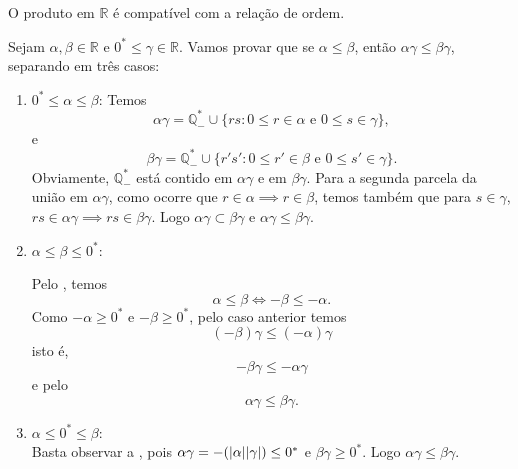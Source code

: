 \documentclass[../main.tex]{subfiles}
\begin{document}
\begin{teo}\label{reais-teo-multCompativelOrdem}
    O produto em $\mathbb{R}$ é compatível com a relação de ordem.
\end{teo}
\begin{dem}
    Sejam $\alpha, \beta \in \mathbb{R}$ e $0^* \leq \gamma \in \mathbb{R}$. Vamos provar que se $\alpha \leq \beta$, então $\alpha \gamma \leq \beta \gamma$, separando em três casos:
    \begin{enumerate}
        \item $0^* \leq \alpha \leq \beta$:
            Temos 
            \[ \alpha\gamma = \mathbb{Q}_{-}^* \cup \{ rs : 0 \leq r \in \alpha \text{ e } 0 \leq s \in \gamma \}, \]
            e
            \[ \beta\gamma = \mathbb{Q}_{-}^* \cup \{ r's' : 0 \leq r' \in \beta \text{ e } 0 \leq s' \in \gamma \}. \]
            Obviamente, $\mathbb{Q}_{-}^* $ está contido em $\alpha\gamma$ e em $\beta\gamma$. Para a segunda parcela da união em $\alpha\gamma$, como ocorre que $r \in \alpha \implies r \in \beta$, temos também que para $s \in \gamma$, $rs \in \alpha\gamma \implies rs \in \beta\gamma$. Logo $\alpha\gamma \subset \beta\gamma$ e $\alpha\gamma \leq \beta\gamma$.

        \item $\alpha \leq \beta \leq 0^*$: 
            
            Pelo , temos 
            \[ \alpha \leq \beta \iff - \beta \leq - \alpha. \]
            Como $-\alpha \geq 0^*$ e $-\beta \geq 0^*$, pelo caso anterior temos 
            \[ (-\beta)\gamma \leq (-\alpha)\gamma \]
            isto é, 
            \[ -\beta\gamma \leq -\alpha\gamma \]
            e  pelo  
            \[ \alpha\gamma \leq \beta\gamma. \]
            

        \item $\alpha \leq 0^* \leq \beta$: \\
            Basta observar a , pois $\alpha\gamma = -(\abs{\alpha}\abs{\gamma}) \leq 0^*$ e $\beta\gamma \geq 0^*$. Logo $\alpha\gamma \leq \beta\gamma.$
    \end{enumerate}
\end{dem}
\end{document}
